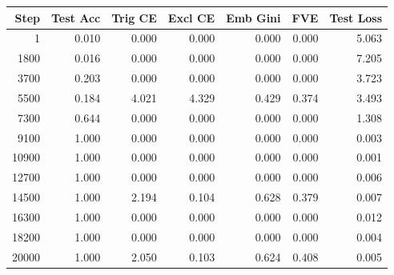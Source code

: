 \begin{longtable}{rrrrrrr}
\toprule
Step & Test Acc & Trig CE & Excl CE & Emb Gini & FVE & Test Loss \\
\midrule
\endhead
1 & 0.010 & 0.000 & 0.000 & 0.000 & 0.000 & 5.063 \\
1800 & 0.016 & 0.000 & 0.000 & 0.000 & 0.000 & 7.205 \\
3700 & 0.203 & 0.000 & 0.000 & 0.000 & 0.000 & 3.723 \\
5500 & 0.184 & 4.021 & 4.329 & 0.429 & 0.374 & 3.493 \\
7300 & 0.644 & 0.000 & 0.000 & 0.000 & 0.000 & 1.308 \\
9100 & 1.000 & 0.000 & 0.000 & 0.000 & 0.000 & 0.003 \\
10900 & 1.000 & 0.000 & 0.000 & 0.000 & 0.000 & 0.001 \\
12700 & 1.000 & 0.000 & 0.000 & 0.000 & 0.000 & 0.006 \\
14500 & 1.000 & 2.194 & 0.104 & 0.628 & 0.379 & 0.007 \\
16300 & 1.000 & 0.000 & 0.000 & 0.000 & 0.000 & 0.012 \\
18200 & 1.000 & 0.000 & 0.000 & 0.000 & 0.000 & 0.004 \\
20000 & 1.000 & 2.050 & 0.103 & 0.624 & 0.408 & 0.005 \\
\bottomrule
\end{longtable}
